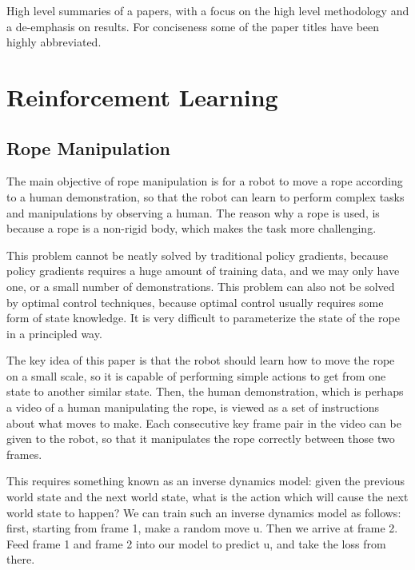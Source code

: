 \documentclass[12pt]{article}
\begin{document}
\maketitle

High level summaries of a papers, with a focus on the high level methodology and a de-emphasis on results. For conciseness some of the paper titles have been highly abbreviated.

\tableofcontents

\section{Reinforcement Learning}

\subsection{Rope Manipulation \cite{RopeManipulation}}

The main objective of rope manipulation is for a robot to move a rope according to a human demonstration, so that the robot can learn to perform complex tasks and manipulations by observing a human. The reason why a rope is used, is because a rope is a non-rigid body, which makes the task more challenging.

This problem cannot be neatly solved by traditional policy gradients, because policy gradients requires a huge amount of training data, and we may only have one, or a small number of demonstrations. This problem can also not be solved by optimal control techniques, because optimal control usually requires some form of state knowledge. It is very difficult to parameterize the state of the rope in a principled way.

The key idea of this paper is that the robot should learn how to move the rope on a small scale, so it is capable of performing simple actions to get from one state to another similar state. Then, the human demonstration, which is perhaps a video of a human manipulating the rope, is viewed as a set of instructions about what moves to make. Each consecutive key frame pair in the video can be given to the robot, so that it manipulates the rope correctly between those two frames.

This requires something known as an inverse dynamics model: given the previous world state and the next world state, what is the action which will cause the next world state to happen? We can train such an inverse dynamics model as follows: first, starting from frame 1, make a random move u. Then we arrive at frame 2. Feed frame 1 and frame 2 into our model to predict u, and take the loss from there.
\end{document}
